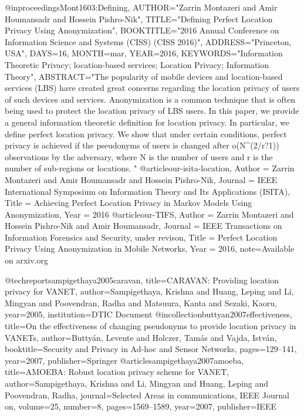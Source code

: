 {{{{{	
	@inproceedings{Mont1603:Defining,
	AUTHOR="Zarrin Montazeri and Amir Houmansadr and Hossein Pishro-Nik",
	TITLE="Defining Perfect Location Privacy Using Anonymization",
	BOOKTITLE="2016 Annual Conference on Information Science and Systems (CISS) (CISS
	2016)",
	ADDRESS="Princeton, USA",
	DAYS=16,
	MONTH=mar,
	YEAR=2016,
	KEYWORDS="Information Theoretic Privacy; location-based services; Location Privacy;
	Information Theory",
	ABSTRACT="The popularity of mobile devices and location-based services (LBS) have
	created great concerns regarding the location privacy of users of such
	devices and services. Anonymization is a common technique that is often
	being used to protect the location privacy of LBS users. In this paper, we
	provide a general information theoretic definition for location privacy. In
	particular, we define perfect location privacy. We show that under certain
	conditions, perfect privacy is achieved if the pseudonyms of users is
	changed after o(N^(2/r?1)) observations by the adversary, where N is the
	number of users and r is the number of sub-regions or locations.
	"
	}
	@article{our-isita-location,
	Author = {Zarrin Montazeri and Amir Houmansadr and Hossein Pishro-Nik},
	Journal = {IEEE International Symposium on Information Theory and Its Applications (ISITA)},
	Title = {Achieving Perfect Location Privacy in Markov Models Using Anonymization},
	Year = {2016}
	}
	@article{our-TIFS,
	Author = {Zarrin Montazeri and Hossein Pishro-Nik and Amir Houmansadr},
	Journal = {IEEE Transactions on Information Forensics and Security, under revison},
	Title = {Perfect Location Privacy Using Anonymization in Mobile Networks},
	Year = {2016},
	note={Available on arxiv.org}
	}
	
	
	
	@techreport{sampigethaya2005caravan,
	title={CARAVAN: Providing location privacy for VANET},
	author={Sampigethaya, Krishna and Huang, Leping and Li, Mingyan and Poovendran, Radha and Matsuura, Kanta and Sezaki, Kaoru},
	year={2005},
	institution={DTIC Document}
	}
	@incollection{buttyan2007effectiveness,
	title={On the effectiveness of changing pseudonyms to provide location privacy in VANETs},
	author={Butty{\'a}n, Levente and Holczer, Tam{\'a}s and Vajda, Istv{\'a}n},
	booktitle={Security and Privacy in Ad-hoc and Sensor Networks},
	pages={129--141},
	year={2007},
	publisher={Springer}
	}
	@article{sampigethaya2007amoeba,
	title={AMOEBA: Robust location privacy scheme for VANET},
	author={Sampigethaya, Krishna and Li, Mingyan and Huang, Leping and Poovendran, Radha},
	journal={Selected Areas in communications, IEEE Journal on},
	volume={25},
	number={8},
	pages={1569--1589},
	year={2007},
	publisher={IEEE}
	}
	
}}}}}
